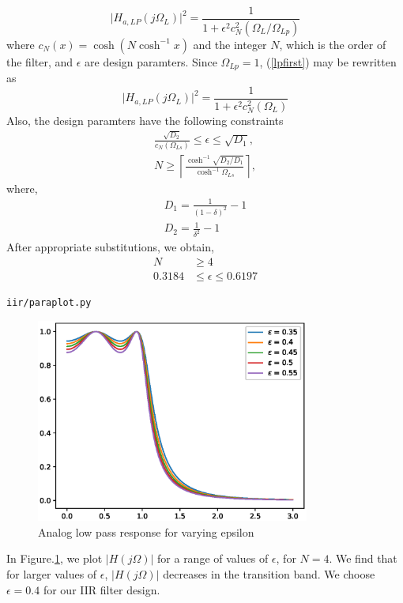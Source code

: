\documentclass[journal,12pt,twocolumn]{IEEEtran}
\begin{document}
\begin{enumerate}
\begin{equation}
\label{lpfirst}
\vert H_{a,LP}(j\Omega_L)\vert^2 = \frac{1}{1 + \epsilon^2c_N^2(\Omega_L/\Omega_{Lp})}
\end{equation}
where $c_N(x) = \cosh(N \cosh^{-1}x)$ and the integer $N$, which is the order of the filter, and $\epsilon$ are design paramters.  Since $\Omega_{Lp} = 1$, (\ref{lpfirst}) may be rewritten as
\begin{equation}
\label{lpsecond}
\vert H_{a,LP}(j\Omega_L)\vert^2 = \frac{1}{1 + \epsilon^2c_N^2(\Omega_L)}
\end{equation}
Also, the design paramters have the following constraints
\begin{eqnarray}
\label{lpdesign}
\frac{\sqrt{D_2}}{c_N(\Omega_{Ls})} \leq \epsilon \leq \sqrt{D_1}, \nonumber \\
N \geq \left\lceil \frac{\cosh^{-1}\sqrt{D_2/D_1}}{\cosh^{-1}\Omega_{Ls}} \right\rceil,
\end{eqnarray}
where,
\begin{align}
D_1 = \frac{1}{(1 - \delta)^2}-1\\
D_2 = \frac{1}{\delta^2} - 1
\end{align}  
After appropriate substitutions,
we obtain,
\begin{align}
    N &\geq 4\\
    0.3184 &\leq \epsilon \leq 0.6197
\end{align}
\begin{lstlisting}
iir/paraplot.py
\end{lstlisting}
\begin{figure}[!ht]
    \centering
    \includegraphics[width=9cm]{./figs/iir/Varying_epsilon.eps}
    \caption{Analog low pass response for varying epsilon}
    \label{fig:varying_epsilon}
\end{figure}
In Figure.\ref{fig:varying_epsilon}, we plot $\vert H(j\Omega)\vert$ for a range of values of $\epsilon$, for $N = 4$.  We find that for larger values of $\epsilon$, $|H(j\Omega)|$ decreases in the transition band.  We choose $\epsilon = 0.4$  for our IIR filter design.  

\end{enumerate}
\end{document}
